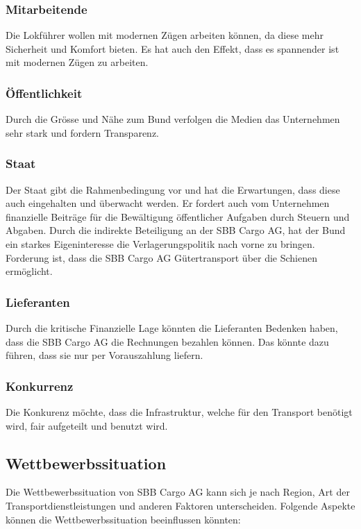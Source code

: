 \documentclass{article}
\begin{document}
\subsubsection{Mitarbeitende}
Die Lokführer wollen mit modernen Zügen arbeiten können, da diese mehr Sicherheit und Komfort bieten.
Es hat auch den Effekt, dass es spannender ist mit modernen Zügen zu arbeiten. 

\subsubsection{Öffentlichkeit}
Durch die Grösse und Nähe zum Bund verfolgen die Medien das Unternehmen sehr stark und fordern Transparenz.

\subsubsection{Staat}
Der Staat gibt die Rahmenbedingung vor und hat die Erwartungen, dass diese auch eingehalten und überwacht werden.
Er fordert auch vom Unternehmen finanzielle Beiträge für die Bewältigung öffentlicher Aufgaben durch Steuern und Abgaben.
Durch die indirekte Beteiligung an der SBB Cargo AG, hat der Bund ein starkes Eigeninteresse die Verlagerungspolitik nach vorne zu bringen.
Forderung ist, dass die SBB Cargo AG Gütertransport über die Schienen ermöglicht.

\subsubsection{Lieferanten}
Durch die kritische Finanzielle Lage könnten die Lieferanten Bedenken haben, dass die SBB Cargo AG die Rechnungen bezahlen können.
Das könnte dazu führen, dass sie nur per Vorauszahlung liefern.

\subsubsection{Konkurrenz}
Die Konkurenz möchte, dass die Infrastruktur, welche für den Transport benötigt wird, fair aufgeteilt und benutzt wird.


\subsection{Wettbewerbssituation}
Die Wettbewerbssituation von SBB Cargo AG kann sich je nach Region, Art der Transportdienstleistungen und anderen Faktoren unterscheiden.
Folgende Aspekte können die Wettbewerbssituation beeinflussen könnten: 
\end{document}
